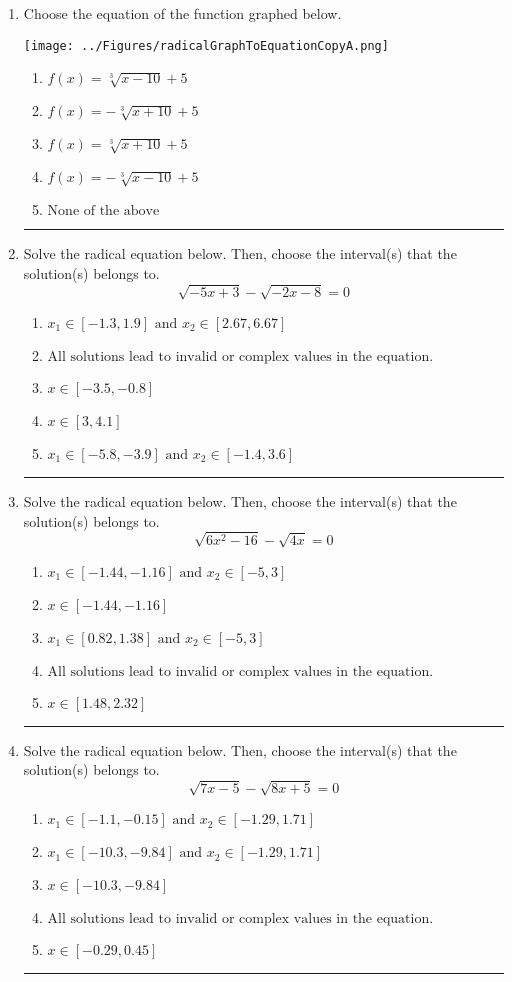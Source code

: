 \documentclass[14pt]{extbook}
\newcommand{\litem}[1]{\item#1\hspace*{-1cm}\rule{\textwidth}{0.4pt}}
\begin{document}
\begin{enumerate}
{\begin{enumerate}[label=\Alph*.]
\end{enumerate} }
\litem{
Choose the equation of the function graphed below.
\begin{center}
    \texttt{[image: ../Figures/radicalGraphToEquationCopyA.png]}
\end{center}
\begin{enumerate}[label=\Alph*.]
\item \( f(x) = \sqrt[3]{x - 10} + 5 \)
\item \( f(x) = - \sqrt[3]{x + 10} + 5 \)
\item \( f(x) = \sqrt[3]{x + 10} + 5 \)
\item \( f(x) = - \sqrt[3]{x - 10} + 5 \)
\item \( \text{None of the above} \)

\end{enumerate} }
\litem{
Solve the radical equation below. Then, choose the interval(s) that the solution(s) belongs to.\[ \sqrt{-5 x + 3} - \sqrt{-2 x - 8} = 0 \]\begin{enumerate}[label=\Alph*.]
\item \( x_1 \in [-1.3, 1.9] \text{ and } x_2 \in [2.67,6.67] \)
\item \( \text{All solutions lead to invalid or complex values in the equation.} \)
\item \( x \in [-3.5,-0.8] \)
\item \( x \in [3,4.1] \)
\item \( x_1 \in [-5.8, -3.9] \text{ and } x_2 \in [-1.4,3.6] \)

\end{enumerate} }
\litem{
Solve the radical equation below. Then, choose the interval(s) that the solution(s) belongs to.\[ \sqrt{6 x^2 - 16} - \sqrt{4 x} = 0 \]\begin{enumerate}[label=\Alph*.]
\item \( x_1 \in [-1.44, -1.16] \text{ and } x_2 \in [-5,3] \)
\item \( x \in [-1.44,-1.16] \)
\item \( x_1 \in [0.82, 1.38] \text{ and } x_2 \in [-5,3] \)
\item \( \text{All solutions lead to invalid or complex values in the equation.} \)
\item \( x \in [1.48,2.32] \)

\end{enumerate} }
\litem{
Solve the radical equation below. Then, choose the interval(s) that the solution(s) belongs to.\[ \sqrt{7 x - 5} - \sqrt{8 x + 5} = 0 \]\begin{enumerate}[label=\Alph*.]
\item \( x_1 \in [-1.1, -0.15] \text{ and } x_2 \in [-1.29,1.71] \)
\item \( x_1 \in [-10.3, -9.84] \text{ and } x_2 \in [-1.29,1.71] \)
\item \( x \in [-10.3,-9.84] \)
\item \( \text{All solutions lead to invalid or complex values in the equation.} \)
\item \( x \in [-0.29,0.45] \)


\end{enumerate}}
\end{enumerate}
\end{document}
